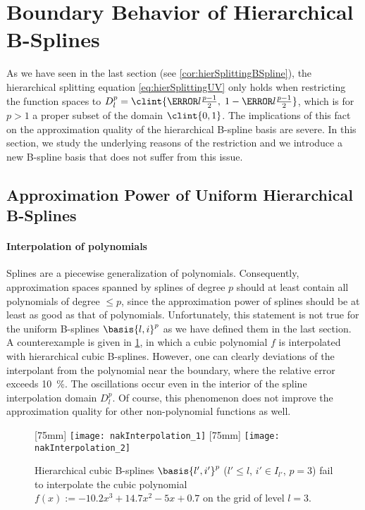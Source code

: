 \section{Boundary Behavior of Hierarchical B-Splines}
\label{sec:32notAKnot}

As we have seen in the last section (see \cref{cor:hierSplittingBSpline}),
the hierarchical splitting equation \eqref{eq:hierSplittingUV}
only holds when restricting the function spaces to
$D_l^p = \clint{\ms{l} \tfrac{p-1}{2},\; 1 - \ms{l} \tfrac{p-1}{2}}$,
which is for $p > 1$ a proper subset of the domain $\clint{0, 1}$.
The implications of this fact on the approximation quality
of the hierarchical B-spline basis are severe.
In this section, we study the underlying reasons of the restriction and
we introduce a new B-spline basis that does not suffer from this issue.



\subsection{Approximation Power of Uniform Hierarchical B-Splines}
\label{sec:321approximation}


\paragraph{Interpolation of polynomials}

Splines are a piecewise generalization of polynomials.
Consequently, approximation spaces spanned by splines of degree $p$ should
at least contain all polynomials of degree $\le p$,
since the approximation power of splines should be at least as good
as that of polynomials.
Unfortunately, this statement is not true for the uniform B-splines
$\basis{l,i}^p$ as we have defined them in the last section.
A counterexample is given in \cref{fig:nakInterpolation},
in which a cubic polynomial $f$ is interpolated with
hierarchical cubic B-splines.
However, one can clearly deviations of the interpolant from the polynomial
near the boundary, where the relative error exceeds \SI{10}{\percent}.
The oscillations occur even in the interior of the
spline interpolation domain $D_l^p$.
Of course, this phenomenon does not improve the approximation quality
for other non-polynomial functions as well.

\begin{figure}
  [75mm]{%
    \texttt{[image: nakInterpolation\_1]}%
  }%
  \hfill%
  [75mm]{%
    \texttt{[image: nakInterpolation\_2]}%
  }%
  \caption{%
    Hierarchical cubic B-splines $\basis{l',i'}^p$
    ($l' \le l$, $i' \in I_{l'}$, $p = 3$)
    fail to interpolate the cubic polynomial
    $f(x) := -10.2 x^3 + 14.7 x^2 - 5x + 0.7$
    on the grid of level $l = 3$.%
  }
  \label{fig:nakInterpolation}
\end{figure}

